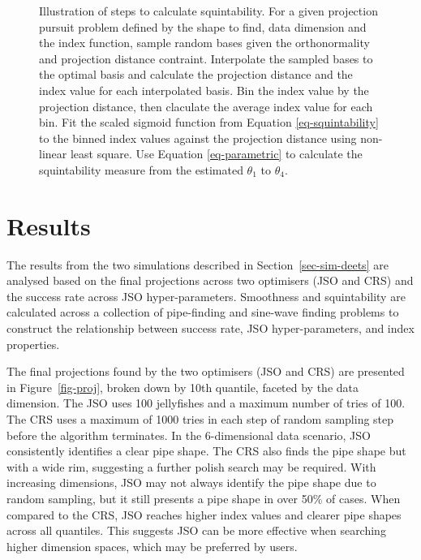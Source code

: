 \documentclass[
  number,
  preprint,
  3p]{elsarticle}
\begin{document}
\begin{figure}


\caption{\label{fig-squintability}Illustration of steps to calculate
squintability. For a given projection pursuit problem defined by the
shape to find, data dimension and the index function, sample random
bases given the orthonormality and projection distance contraint.
Interpolate the sampled bases to the optimal basis and calculate the
projection distance and the index value for each interpolated basis. Bin
the index value by the projection distance, then claculate the average
index value for each bin. Fit the scaled sigmoid function from Equation
\ref{eq-squintability} to the binned index values against the projection
distance using non-linear least square. Use Equation \ref{eq-parametric}
to calculate the squintability measure from the estimated \(\theta_1\)
to \(\theta_4\).}

\end{figure}%

\section{Results}\label{sec-sim-res}

The results from the two simulations described in
Section~\ref{sec-sim-deets} are analysed based on the final projections
across two optimisers (JSO and CRS) and the success rate across JSO
hyper-parameters. Smoothness and squintability are calculated across a
collection of pipe-finding and sine-wave finding problems to construct
the relationship between success rate, JSO hyper-parameters, and index
properties.

The final projections found by the two optimisers (JSO and CRS) are
presented in Figure~\ref{fig-proj}, broken down by 10th quantile,
faceted by the data dimension. The JSO uses 100 jellyfishes and a
maximum number of tries of 100. The CRS uses a maximum of 1000 tries in
each step of random sampling step before the algorithm terminates. In
the 6-dimensional data scenario, JSO consistently identifies a clear
pipe shape. The CRS also finds the pipe shape but with a wide rim,
suggesting a further polish search may be required. With increasing
dimensions, JSO may not always identify the pipe shape due to random
sampling, but it still presents a pipe shape in over 50\% of cases. When
compared to the CRS, JSO reaches higher index values and clearer pipe
shapes across all quantiles. This suggests JSO can be more effective
when searching higher dimension spaces, which may be preferred by users.
\end{document}
